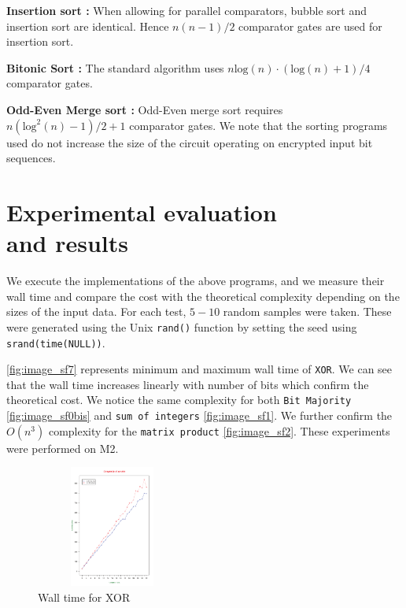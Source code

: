 \documentclass{acm_proc_article-sp}
\begin{document}
\textbf{Insertion sort :} When allowing for parallel comparators, bubble sort and insertion sort are identical. Hence $n(n-1)/2$ comparator gates are used for insertion sort.

\textbf{Bitonic Sort :} The standard algorithm uses $n\mathrm{log}(n)·(\mathrm{log}(n)+1)/4$ comparator gates. 

\textbf{Odd-Even Merge sort :} Odd-Even merge sort requires  $n(\mathrm{log}^{2}(n)-1)/2 + 1 $ comparator gates.
We note that the sorting programs used do not increase the size of the circuit operating on encrypted input bit sequences. 

\section{Experimental evaluation \\ and results}
\label{Sec:Eval}
We execute the implementations of the above programs, and we measure their wall time and compare the cost with the theoretical complexity depending on the sizes of the input data. For each test, $5-10$ random samples were taken. These were generated using the Unix \texttt{rand()} function by setting the seed using \texttt{srand(time(NULL))}. 

 \autoref{fig:image_sf7} represents minimum and maximum wall time of \texttt{XOR}. We can see that the wall time increases linearly with number of bits which confirm the theoretical cost. We notice the same complexity for both \texttt{Bit Majority} \autoref{fig:image_sf0bis} and \texttt{sum of integers} \autoref{fig:image_sf1}. We further confirm the $O(n^{3})$ complexity for the \texttt{matrix product} \autoref{fig:image_sf2}. These experiments were performed on M2.


\begin{figure}[!H]%
\centering
\includegraphics[width=5cm, height=4cm]{f4.pdf} 
\caption{Wall time for XOR} 
\label{fig:image_sf0} %
\end{figure}
\end{document}

